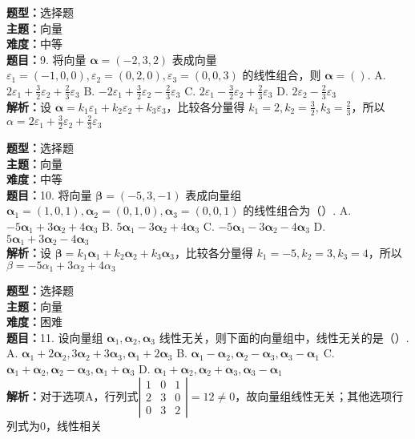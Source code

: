 \documentclass{ctexart}
\newenvironment{question}[5]{%
	\noindent\textbf{题型：}#1\\
	\textbf{主题：}#2\\
	\textbf{难度：}#3\\
	\textbf{题目：}#4\\
	\textbf{解析：}#5\\
	\vspace{1em}
}{}
\begin{document}
	\begin{question}
		{选择题}
		{向量}
		{中等}
		{9. 将向量 \(\boldsymbol{\alpha}=(-2,3,2)\) 表成向量 \(\varepsilon_1=(-1,0,0), \varepsilon_2=(0,2,0), \varepsilon_3=(0,0,3)\) 的线性组合，则 \(\boldsymbol{\alpha}=()\). 
			A. \(2\varepsilon_1+\frac{3}{2}\varepsilon_2+\frac{2}{3}\varepsilon_3\)
			B. \(-2\varepsilon_1+\frac{3}{2}\varepsilon_2-\frac{2}{3}\varepsilon_3\)
			C. \(2\varepsilon_1-\frac{3}{2}\varepsilon_2+\frac{2}{3}\varepsilon_3\)
			D. \(2\varepsilon_2-\frac{2}{3}\varepsilon_3\)}
		{设 \(\boldsymbol{\alpha}=k_1\varepsilon_1+k_2\varepsilon_2+k_3\varepsilon_3\)，比较各分量得 \(k_1=2,k_2=\frac{3}{2},k_3=\frac{2}{3}\)，所以 \(\alpha=2\varepsilon_1+\frac{3}{2}\varepsilon_2+\frac{2}{3}\varepsilon_3\)}
	\end{question}
	
	\begin{question}
		{选择题}
		{向量}
		{中等}
		{10. 将向量 \(\boldsymbol{\beta}=(-5,3,-1)\) 表成向量组 \(\boldsymbol{\alpha}_1=(1,0,1), \boldsymbol{\alpha}_2=(0,1,0), \boldsymbol{\alpha}_3=(0,0,1)\) 的线性组合为（）. 
			A. \(-5\boldsymbol{\alpha}_1+3\boldsymbol{\alpha}_2+4\boldsymbol{\alpha}_3\)
			B. \(5\boldsymbol{\alpha}_1-3\boldsymbol{\alpha}_2+4\boldsymbol{\alpha}_3\)
			C. \(-5\boldsymbol{\alpha}_1-3\boldsymbol{\alpha}_2-4\boldsymbol{\alpha}_3\)
			D. \(5\boldsymbol{\alpha}_1+3\boldsymbol{\alpha}_2-4\boldsymbol{\alpha}_3\)}
		{设 \(\boldsymbol{\beta}=k_1\boldsymbol{\alpha}_1+k_2\boldsymbol{\alpha}_2+k_3\boldsymbol{\alpha}_3\)，比较各分量得 \(k_1=-5,k_2=3,k_3=4\)，所以 \(\beta=-5\alpha_1+3\alpha_2+4\alpha_3\)}
	\end{question}
	
	\begin{question}
		{选择题}
		{向量}
		{困难}
		{11. 设向量组 \(\boldsymbol{\alpha}_1, \boldsymbol{\alpha}_2, \boldsymbol{\alpha}_3\) 线性无关，则下面的向量组中，线性无关的是（）. 
			A. \(\boldsymbol{\alpha}_1+2\boldsymbol{\alpha}_2, 3\boldsymbol{\alpha}_2+3\boldsymbol{\alpha}_3, \boldsymbol{\alpha}_1+2\boldsymbol{\alpha}_3\)
			B. \(\boldsymbol{\alpha}_1-\boldsymbol{\alpha}_2, \boldsymbol{\alpha}_2-\boldsymbol{\alpha}_3, \boldsymbol{\alpha}_3-\boldsymbol{\alpha}_1\)
			C. \(\boldsymbol{\alpha}_1+\boldsymbol{\alpha}_2, \boldsymbol{\alpha}_2-\boldsymbol{\alpha}_3, \boldsymbol{\alpha}_1+\boldsymbol{\alpha}_3\)
			D. \(\boldsymbol{\alpha}_1+\boldsymbol{\alpha}_2, \boldsymbol{\alpha}_2+\boldsymbol{\alpha}_3, \boldsymbol{\alpha}_3-\boldsymbol{\alpha}_1\)}
		{对于选项A，行列式\(\left|\begin{array}{lll}1 & 0 & 1 \\ 2 & 3 & 0 \\ 0 & 3 & 2\end{array}\right|=12 \neq 0\)，故向量组线性无关；其他选项行列式为0，线性相关}
	\end{question}
	
\end{document}

